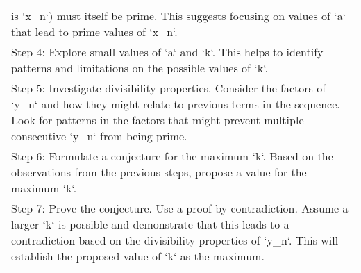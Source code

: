 \begin{table*}
\begin{tabular}{p{\linewidth}}
is `x\_n`) must itself be prime.  This suggests focusing on values of `a` that lead to prime values of `x\_n`.\\ Step 4: Explore small values of `a` and `k`. This helps to identify patterns and limitations on the possible values of `k`.\\ Step 5:  Investigate divisibility properties. Consider the factors of `y\_n` and how they might relate to previous terms in the sequence.  Look for patterns in the factors that might prevent multiple consecutive `y\_n` from being prime.\\ Step 6: Formulate a conjecture for the maximum `k`. Based on the observations from the previous steps, propose a value for the maximum `k`.\\ Step 7: Prove the conjecture. Use a proof by contradiction. Assume a larger `k` is possible and demonstrate that this leads to a contradiction based on the divisibility properties of `y\_n`. This will establish the proposed value of `k` as the maximum. \\ \midrule

\end{tabular}
\end{table*}
